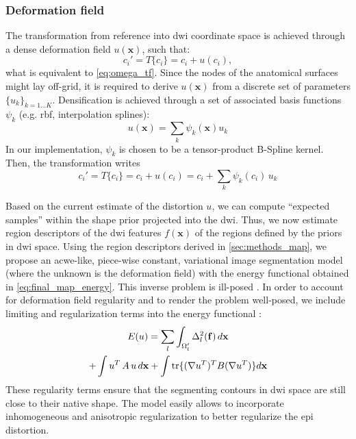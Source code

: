 \subsubsection{Deformation field}
\label{sec:deformation_field}
The transformation from reference into \gls{dwi} coordinate space is 
achieved through a dense deformation field $u(\mathbf{x})$, such that:
\begin{equation}
c_i' = T\{c_i\} = c_i + u(c_i),
\end{equation}
what is equivalent to \eqref{eq:omega_tf}. Since the nodes of the anatomical 
surfaces might lay off-grid, it is required to derive $u(\mathbf{x})$ from a discrete 
set of parameters $\{u_k\}_{k=1 \ldots K}$. Densification is achieved through 
a set of associated basis functions $\psi_k$ (e.g. rbf, interpolation splines):
%
\begin{equation}
u(\mathbf{x}) = \sum_k \psi_k(\mathbf{x}) u_k
\end{equation}
%
In our implementation, $\psi_k$ is chosen to be a tensor-product B-Spline kernel.
Then, the transformation writes
%
\begin{equation}
\label{eq:transformation}
c_i' = T\{c_i\} = c_i + u(c_i) = c_i + \sum_k \psi_k(c_i)\,u_k
\end{equation} 

Based on the current estimate of the distortion $u$, we can compute 
``expected samples'' within the shape prior projected into the \gls{dwi}.
Thus, we now estimate region descriptors of the \gls{dwi} features 
$f(\mathbf{x})$ of the regions defined by the priors in \gls{dwi} space.
%
Using the region descriptors derived in \autoref{sec:methods_map}, we propose
an \gls{acwe}-like, piece-wise constant, variational image segmentation
model (where the unknown is the deformation field)
\cite{chan_active_2001} with the energy functional obtained in 
\eqref{eq:final_map_energy}. This inverse problem is ill-posed
\cite{bertero_ill-posed_1988,hadamard_sur_1902}.
In order to account for deformation field regularity and to render the 
problem well-posed, we include limiting and regularization terms into 
the energy functional \cite{morozov_linear_1975,tichonov_solution_1963}:
%
\begin{multline}
E(u) = \sum\limits_l \int_{\Omega'_l} \Delta^2_l (\mathbf{f}) \,d\mathbf{x} \\
+ \int u^T \, A \, u \, d\mathbf{x} + \int \tr\{(\nabla u^T)^T B (\nabla u^T)\} d\mathbf{x}
\label{eq:complete_energy}
\end{multline}
%
These regularity terms ensure that the segmenting contours in 
\gls{dwi} space are still close to their native shape. The model
easily allows to incorporate inhomogeneous and anisotropic 
regularization \cite{nagel_investigation_1986} to better regularize
the \gls{epi} distortion. \\
%

